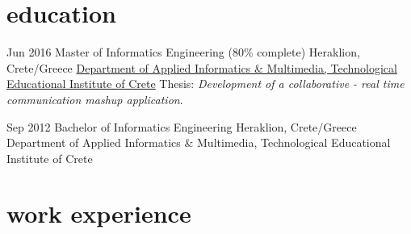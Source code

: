\vspace{-0.3cm}
\section{\normalfont education}

\begin{entrylist}
\entry
{Jun 2016}
{Master {\normalfont of Informatics Engineering}}
{(80\% complete) Heraklion, Crete/Greece}
{\href{https://www.teicrete.gr/}{Department of Applied Informatics \& Multimedia, Technological Educational Institute of Crete}}
Thesis: \emph{Development of a collaborative - real time communication mashup application}.\\
\vspace{-.4cm}

\entry
{Sep 2012}
{Bachelor {\normalfont of Informatics Engineering}}
{Heraklion, Crete/Greece}
Department of Applied Informatics \& Multimedia, Technological Educational Institute of Crete
\end{entrylist}

\vspace{-.4cm}
\section{\normalfont work experience}

